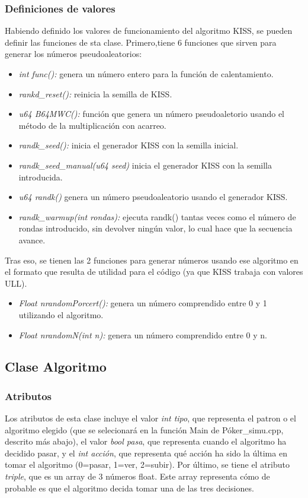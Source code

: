 \subsubsection{Definiciones de valores}
Habiendo definido los valores de funcionamiento del algoritmo KISS, se pueden definir las funciones de sta clase. Primero,tiene 6 funciones que sirven para generar los números pseudoaleatorios: \cite{kiss2,kiss1}
\begin{itemize}
\item \textit{int func():} genera un número entero para la función de calentamiento.
\item\textit{ rankd\_reset():} reinicia la semilla de KISS.
\item\textit{u64 B64MWC():} función que genera un número pseudoaletorio usando el método de la multiplicación con acarreo.
\item\textit{randk\_seed():} inicia el generador KISS con la semilla inicial.
\item\textit{ randk\_seed\_manual(u64 seed)} inicia el generador KISS con la semilla introducida.
\item\textit{ u64 randk()} genera un número pseudoaleatorio usando el generador KISS.
\item\textit{randk\_warmup(int rondas):} ejecuta randk() tantas veces como el número de rondas introducido, sin devolver ningún valor, lo cual hace que la secuencia avance.
 \end{itemize}
Tras eso, se tienen las 2 funciones para generar números usando ese algoritmo en el formato que resulta de utilidad para el código (ya que KISS trabaja con valores ULL).
\begin{itemize}
\item \textit{Float nrandomPorcert():} genera un número comprendido entre 0 y 1 utilizando el algoritmo.
\item\textit{ Float nrandomN(int n):} genera un número comprendido entre 0 y n.
 \end{itemize}

\subsection{Clase Algoritmo}
\label{sec:algmoto}
\subsubsection{Atributos}


Los atributos de esta clase incluye el valor \textit{int tipo}, que representa el patron o el algoritmo elegido (que se selecionará en la función Main de Póker\_simu.cpp, descrito más abajo), el valor \textit{ bool pasa}, que representa cuando el algoritmo ha decidido pasar, y el \textit{int acción}, que representa qué acción ha sido la última en tomar el algoritmo (0=pasar, 1=ver, 2=subir).
Por último, se tiene el atributo \textit{triple}, que es un array de 3 números float. Este array representa cómo de probable es que el algoritmo decida tomar una de las tres decisiones. 

